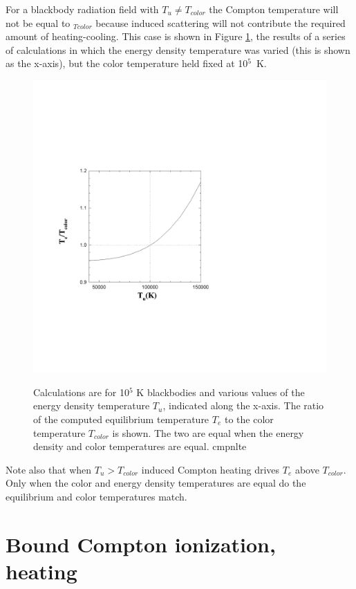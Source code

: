 For a blackbody radiation field with $T_u \ne T_{color}$ the Compton temperature
will not be equal to $_{Tcolor}$ because induced scattering will not contribute
the required amount of heating-cooling.  This case is shown in Figure
\ref{fig:ComptonSTE},
the results of a series of calculations in which the energy density
temperature was varied (this is shown as the x-axis), but the color
temperature held fixed at 10$^5$~K.

\begin{figure}
\centering
\includegraphics[scale=0.75]{ComptonSTE}
\label{fig:ComptonSTE}
\caption[Compton equilibrium in the STE limit]{Calculations are for 10$^5$ K blackbodies and various values of the
energy density temperature $T_u$, indicated along the x-axis. The ratio of
the computed equilibrium temperature $T_e$ to the color temperature
$T_{color}$
is shown.  The two are equal when the energy density and color temperatures
are equal. cmpnlte}
\end{figure}

Note also that when $T_u > T_{color}$ induced Compton heating
drives $T_e$ above $T_{color}$.
Only when the color and energy density temperatures are equal
do the equilibrium and color temperatures match.

\section{Bound Compton ionization, heating}

